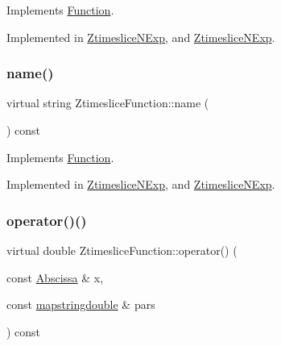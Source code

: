 Implements \mbox{\hyperlink{classFunction_ac6dc83996d6f002141a0a0f66f2c6496}{Function}}.



Implemented in \mbox{\hyperlink{classZtimesliceNExp_a012d885734f62a67b2d1ffc0d4128b0b}{Ztimeslice\+N\+Exp}}, and \mbox{\hyperlink{classZtimesliceNExp_a012d885734f62a67b2d1ffc0d4128b0b}{Ztimeslice\+N\+Exp}}.

\mbox{\label{classZtimesliceFunction_a3c98a40a6155270bbb11d74c1b0f838c}} 
\subsubsection{\texorpdfstring{name()}{name()}\hspace{0.1cm}{\footnotesize\ttfamily [2/2]}}
{\footnotesize\ttfamily virtual string Ztimeslice\+Function\+::name (\begin{DoxyParamCaption}{ }\end{DoxyParamCaption}) const\hspace{0.3cm}{\ttfamily [pure virtual]}}



Implements \mbox{\hyperlink{classFunction_ac6dc83996d6f002141a0a0f66f2c6496}{Function}}.



Implemented in \mbox{\hyperlink{classZtimesliceNExp_a012d885734f62a67b2d1ffc0d4128b0b}{Ztimeslice\+N\+Exp}}, and \mbox{\hyperlink{classZtimesliceNExp_a012d885734f62a67b2d1ffc0d4128b0b}{Ztimeslice\+N\+Exp}}.

\mbox{\label{classZtimesliceFunction_ae7851ae590054311c69cdafc8f7ed621}} 
\subsubsection{\texorpdfstring{operator()()}{operator()()}\hspace{0.1cm}{\footnotesize\ttfamily [1/4]}}
{\footnotesize\ttfamily virtual double Ztimeslice\+Function\+::operator() (\begin{DoxyParamCaption}\item[{const \mbox{\hyperlink{classAbscissa}{Abscissa}} \&}]{x,  }\item[{const \mbox{\hyperlink{lib_2fitting__lib_2includes_8h_a647b481c557c7966517f753340a81d13}{mapstringdouble}} \&}]{pars }\end{DoxyParamCaption}) const\hspace{0.3cm}{\ttfamily [pure virtual]}}



